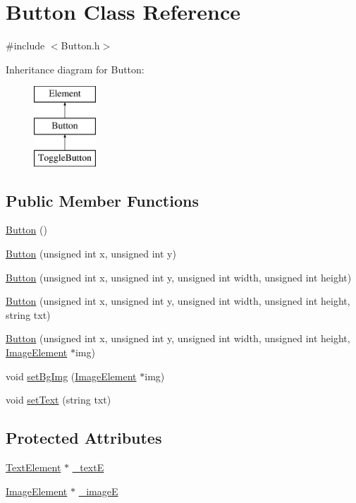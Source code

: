 \hypertarget{class_button}{\section{Button Class Reference}
\label{class_button}
}


{\ttfamily \#include $<$Button.\-h$>$}

Inheritance diagram for Button\-:\begin{figure}[H]
\begin{center}
\leavevmode
\includegraphics[height=3.000000cm]{class_button}
\end{center}
\end{figure}
\subsection*{Public Member Functions}
\begin{DoxyCompactItemize}
\item 
\hyperlink{class_button_a3b36df1ae23c58aedb9e15a713159459}{Button} ()
\item 
\hyperlink{class_button_afe6b0b69a06839e5381cab7d9eaf4f10}{Button} (unsigned int x, unsigned int y)
\item 
\hyperlink{class_button_a3c5ea0097e8e4abf139a558c53f022d2}{Button} (unsigned int x, unsigned int y, unsigned int width, unsigned int height)
\item 
\hyperlink{class_button_a0446975c84ebf54a1a1fa88690689e34}{Button} (unsigned int x, unsigned int y, unsigned int width, unsigned int height, string txt)
\item 
\hyperlink{class_button_a89eeede6ce15964118eee29990872c96}{Button} (unsigned int x, unsigned int y, unsigned int width, unsigned int height, \hyperlink{class_image_element}{Image\-Element} $\ast$img)
\item 
void \hyperlink{class_button_ab29c5e6dffda94b0e3ca9209baabb75c}{set\-Bg\-Img} (\hyperlink{class_image_element}{Image\-Element} $\ast$img)
\item 
void \hyperlink{class_button_a1794b3856606e75716fc7e2611b1b711}{set\-Text} (string txt)
\end{DoxyCompactItemize}
\subsection*{Protected Attributes}
\begin{DoxyCompactItemize}
\item 
\hyperlink{class_text_element}{Text\-Element} $\ast$ \hyperlink{class_button_a55dcdefb9e223357f1bb1c66c968465c}{\-\_\-text\-E}
\item 
\hyperlink{class_image_element}{Image\-Element} $\ast$ \hyperlink{class_button_a4745f9f13635485445614764193a8bad}{\-\_\-image\-E}
\end{DoxyCompactItemize}


